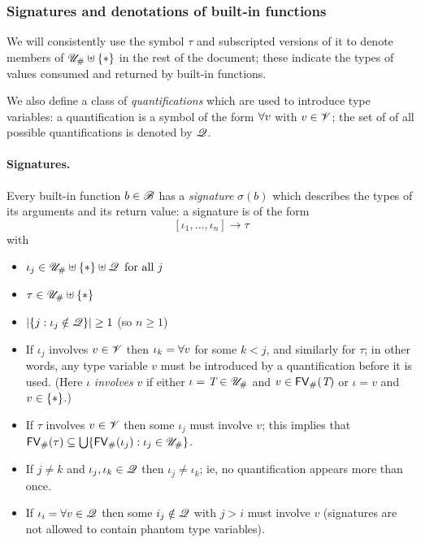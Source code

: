 \subsubsection{Signatures and denotations of built-in functions}
\label{sec:signatures}
We will consistently use the symbol $\tau$ and subscripted versions of it to
denote members of $\UnihashStar$ in the rest of the document; these indicate the
types of values consumed and returned by built-in functions.%

\medskip
\noindent We also define a class of \textit{quantifications} which are used to
introduce type variables: a quantification is a symbol of the form
$\mathbf{\forall}v$ with $v \in \mathscr{V}$; the set of of all possible quantifications is
denoted by $\mathscr{Q}$.%
%

\medskip
\paragraph{Signatures.}
Every built-in function $b \in \mathscr{B}$ has a \textit{signature} $\sigma(b)$ which describes
the types of its arguments and its return value: a signature is of the form
$$[\iota_1, \ldots, \iota_n] \rightarrow \tau$$ with
\begin{itemize}
  \item $\iota_j \in \UnihashStar \disj \QVar \enspace\text{for all $j$}$
  \item $\tau \in \UnihashStar$
  \item $\lvert\{j : \iota_j \notin \mathscr{Q}\}\rvert \geq 1$ (so $n \geq 1$)
  \item If $\iota_j$ involves $v \in \mathscr{V}$ then $\iota_k = \mathbf{\forall}v$ for
    some $k < j$, and similarly for $\tau$; in other words, any type variable
    $v$ must be introduced by a quantification before it is used. (Here $\iota$
    \textit{involves} $v$ if either $\iota = \textit{T} \in {\mathscr{U}_{\#}}$ and $v \in \mathsf{FV}_{\#}(\textit{T})$
    or $\iota = v$ and $v \in \VarStar$.)
  \item If $\tau$ involves $v \in \mathscr{V}$ then some $\iota_j$ must involve $v$; this
    implies that $\mathsf{FV}_{\#}(\tau) \subseteq \bigcup \{\mathsf{FV}_{\#}(\iota_j): \iota_j \in {\mathscr{U}_{\#}}\}$.
  \item If $j \neq k$ and $\iota_j, \iota_k \in \mathscr{Q}$ then $\iota_j \neq
    \iota_k$; ie, no quantification appears more than once.
  \item If $\iota_i = \forall v \in \mathscr{Q}$ then some $i_j \notin \mathscr{Q}$ with $j
    > i$ must involve $v$ (signatures are not allowed to contain phantom type variables).
\end{itemize}%
%

